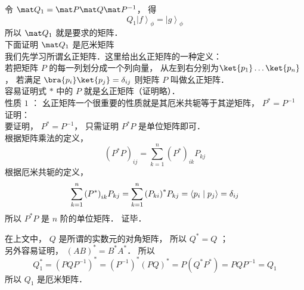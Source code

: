 令 ${\mat Q_1} = \mat P\mat Q{\mat P^{ - 1}}$，  得
\begin{equation}
  {Q_1}{\left| f \right\rangle_\phi } = {\left| g \right\rangle_\phi }
\end{equation}
所以 ${\mat Q_1}$ 就是要求的矩阵．\\
下面证明 ${\mat Q_1}$ 是厄米矩阵\\
我们先学习所谓幺正矩阵．这里给出幺正矩阵的一种定义：\\
若把矩阵 $P$ 的每一列划分成一个列向量， 从左到右分别为$\ket{p_1} \dots\ket{p_n}$，  若满足 $\bra{p_i}\ket{p_j}=\delta_{ij}$ 则矩阵 $P$ 叫做幺正矩阵．\\
容易证明式 $*$ 中的 $P$ 就是幺正矩阵（证明略）．\\
性质 $1$ ： 幺正矩阵一个很重要的性质就是其厄米共轭等于其逆矩阵， ${P^*} = {P^{ - 1}}$ \\
证明：\\
要证明， ${P^*} = {P^{ - 1}}$，  只需证明 ${P^*}P$ 是单位矩阵即可．\\
根据矩阵乘法的定义，
\begin{equation}
{\left( {{P^*}P} \right)_{ij}} = \sum\limits_{k = 1}^n {{{\left( {P^*} \right)}_{ik}}{P_{kj}}}
\end{equation}
根据厄米共轭的定义，
\begin{equation}
 \sum\limits_{k = 1}^n {{{\left( {P^*} \right)}_{ik}}{P_{kj}}}  = \sum\limits_{k = 1}^n {{{\left( {P_{ki}} \right)}^*}{P_{kj}}}  = \left\langle {p_i}
 \mathrel{\left | {\vphantom {{p_i} {p_j}}}
 \right. \kern-\nulldelimiterspace}
 {p_j} \right\rangle  = {\delta_{ij}}
\end{equation}
所以 ${P^*}P$ 是 $n$ 阶的单位矩阵．  证毕．

在上文中， $Q$ 是所谓的实数元的对角矩阵， 所以 ${Q^*} = Q$ ；\\
另外容易证明， ${\left( {AB} \right)^*} = {B^*}{A^*}$．  所以
\begin{equation}
Q_1^* = {\left( {PQ{P^{ - 1}}} \right)^*} = {\left( {P^{ - 1}} \right)^*}{\left( {PQ} \right)^*} = P\left( {{Q^*}{P^*}} \right) = PQ{P^{ - 1}} = {Q_1}
\end{equation}
所以 ${Q_1}$ 是厄米矩阵．

